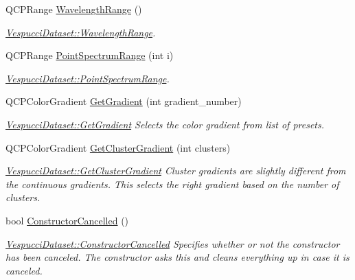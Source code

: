 \begin{DoxyCompactItemize}
Q\+C\+P\+Range \hyperlink{class_vespucci_dataset_ae2583a142dba66a370ecc471b009a7a2}{Wavelength\+Range} ()
\begin{DoxyCompactList}\small\item\em \hyperlink{class_vespucci_dataset_ae2583a142dba66a370ecc471b009a7a2}{Vespucci\+Dataset\+::\+Wavelength\+Range}. \end{DoxyCompactList}\item 
Q\+C\+P\+Range \hyperlink{class_vespucci_dataset_a8f7646308fe2b61e47e007ea36eda489}{Point\+Spectrum\+Range} (int i)
\begin{DoxyCompactList}\small\item\em \hyperlink{class_vespucci_dataset_a8f7646308fe2b61e47e007ea36eda489}{Vespucci\+Dataset\+::\+Point\+Spectrum\+Range}. \end{DoxyCompactList}\item 
Q\+C\+P\+Color\+Gradient \hyperlink{class_vespucci_dataset_ab7f75e6c0ee1ce8831e6c2a0c9750959}{Get\+Gradient} (int gradient\+\_\+number)
\begin{DoxyCompactList}\small\item\em \hyperlink{class_vespucci_dataset_ab7f75e6c0ee1ce8831e6c2a0c9750959}{Vespucci\+Dataset\+::\+Get\+Gradient} Selects the color gradient from list of presets. \end{DoxyCompactList}\item 
Q\+C\+P\+Color\+Gradient \hyperlink{class_vespucci_dataset_ad6234efd06ea775780a1ed2576135f86}{Get\+Cluster\+Gradient} (int clusters)
\begin{DoxyCompactList}\small\item\em \hyperlink{class_vespucci_dataset_ad6234efd06ea775780a1ed2576135f86}{Vespucci\+Dataset\+::\+Get\+Cluster\+Gradient} Cluster gradients are slightly different from the continuous gradients. This selects the right gradient based on the number of clusters. \end{DoxyCompactList}\item 
bool \hyperlink{class_vespucci_dataset_ac02e9051b8fbc280d769598b80c3eb57}{Constructor\+Cancelled} ()
\begin{DoxyCompactList}\small\item\em \hyperlink{class_vespucci_dataset_ac02e9051b8fbc280d769598b80c3eb57}{Vespucci\+Dataset\+::\+Constructor\+Cancelled} Specifies whether or not the constructor has been canceled. The constructor asks this and cleans everything up in case it is canceled. \end{DoxyCompactList}\item 

\end{DoxyCompactItemize}
